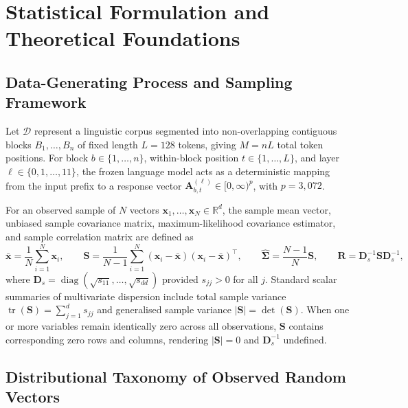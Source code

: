 \documentclass[12pt, a4paper, oneside]{report}
\theoremstyle{definition}
\newcommand{\vect}[1]{\mathbf{#1}}
\newcommand{\mat}[1]{\mathbf{#1}}
\newcommand{\tr}{\operatorname{tr}}
\newcommand{\diag}{\operatorname{diag}}
\newcommand{\R}{\mathbb{R}}
\begin{document}
\chapter{Statistical Formulation and Theoretical Foundations}

\section{Data-Generating Process and Sampling Framework}

Let $\mathcal{D}$ represent a linguistic corpus segmented into non-overlapping contiguous blocks $B_1, \dots, B_n$ of fixed length $L = 128$ tokens, giving $M = n L$ total token positions. For block $b \in \{1, \dots, n\}$, within-block position $t \in \{1, \dots, L\}$, and layer $\ell \in \{0, 1, \dots, 11\}$, the frozen language model acts as a deterministic mapping from the input prefix to a response vector $\vect{A}_{b,t}^{(\ell)} \in [0, \infty)^p$, with $p = 3{,}072$.

For an observed sample of $N$ vectors $\vect{x}_1, \dots, \vect{x}_N \in \R^d$, the sample mean vector, unbiased sample covariance matrix, maximum-likelihood covariance estimator, and sample correlation matrix are defined as
\begin{equation}
    \bar{\vect{x}} = \frac{1}{N}\sum_{i=1}^{N} \vect{x}_i,
    \qquad
    \mat{S} = \frac{1}{N-1}\sum_{i=1}^{N} (\vect{x}_i - \bar{\vect{x}})(\vect{x}_i - \bar{\vect{x}})^\top,
    \qquad
    \hat{\mat{\Sigma}} = \frac{N-1}{N}\mat{S},
    \qquad
    \mat{R} = \mat{D}_s^{-1}\mat{S}\mat{D}_s^{-1},
    \label{eq:sample_moments}
\end{equation}
where $\mat{D}_s = \diag(\sqrt{s_{11}}, \dots, \sqrt{s_{dd}})$ provided $s_{jj} > 0$ for all $j$. Standard scalar summaries of multivariate dispersion include total sample variance $\tr(\mat{S}) = \sum_{j=1}^d s_{jj}$ and generalised sample variance $|\mat{S}| = \det(\mat{S})$. When one or more variables remain identically zero across all observations, $\mat{S}$ contains corresponding zero rows and columns, rendering $|\mat{S}| = 0$ and $\mat{D}_s^{-1}$ undefined.

\section{Distributional Taxonomy of Observed Random Vectors}
\end{document}
